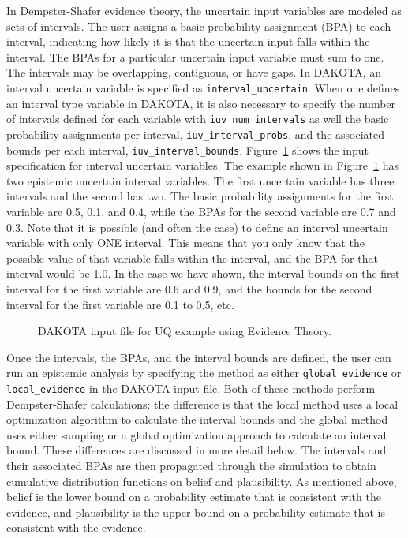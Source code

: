 In Dempster-Shafer evidence theory, the uncertain input variables are
modeled as sets of intervals.  The user assigns a basic probability
assignment (BPA) to each interval, indicating how likely it is that
the uncertain input falls within the interval.  The BPAs for a
particular uncertain input variable must sum to one.  The intervals
may be overlapping, contiguous, or have gaps. In DAKOTA, an interval
uncertain variable is specified as \texttt{interval\_uncertain}.  When
one defines an interval type variable in DAKOTA, it is also necessary
to specify the number of intervals defined for each variable with
\texttt{iuv\_num\_intervals} as well the basic probability assignments
per interval, \texttt{iuv\_interval\_probs}, and the associated bounds
per each interval, \texttt{iuv\_interval\_bounds}. 
Figure~\ref{uq:figure16} shows the input specification for interval
uncertain variables.  The example shown in Figure~\ref{uq:figure16}
has two epistemic uncertain interval variables.  The first uncertain
variable has three intervals and the second has two. The basic
probability assignments for the first variable are 0.5, 0.1, and 0.4,
while the BPAs for the second variable are 0.7 and 0.3. Note that it
is possible (and often the case) to define an interval uncertain
variable with only ONE interval.  This means that you only know that
the possible value of that variable falls within the interval, and the
BPA for that interval would be 1.0.  In the case we have shown, the
interval bounds on the first interval for the first variable are 0.6
and 0.9, and the bounds for the second interval for the first variable
are 0.1 to 0.5, etc.

\begin{figure}
  \centering
  \begin{bigbox}
    \begin{small}
    \end{small}
  \end{bigbox}
\caption{DAKOTA input file for UQ example using Evidence Theory.}
\label{uq:figure16}
\end{figure}

Once the intervals, the BPAs, and the interval bounds are defined, 
the user can run an epistemic analysis by specifying the method as 
either \texttt{global\_evidence} or 
\texttt{local\_evidence} in the DAKOTA input file.  
Both of these methods perform Dempster-Shafer calculations:  
the difference is that the local method uses a local optimization 
algorithm to calculate the interval bounds and the global 
method uses either sampling or a global optimization approach to 
calculate an interval bound.  These differences are discussed in 
more detail below. 
The intervals and their associated BPAs are then propagated through
the simulation to obtain cumulative distribution functions on belief
and plausibility.  As mentioned above, belief is the lower bound on a
probability estimate that is consistent with the evidence, and
plausibility is the upper bound on a probability estimate that is
consistent with the evidence.  


